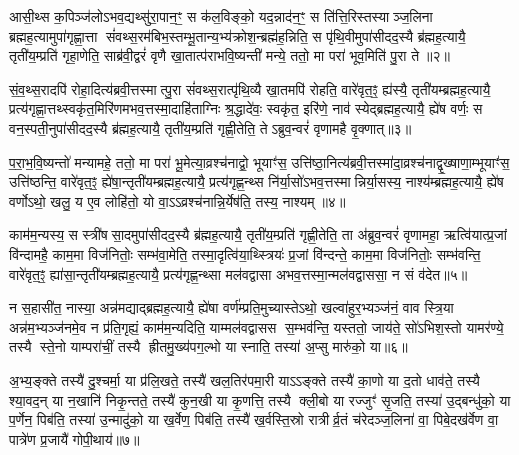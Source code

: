 आसी॒थ्स क॒पिञ्ज॑लोऽभव॒द्यथ्सु॑रा॒पान॒ꣳ॒ स क॑ल॒विङ्को॒ यद॒न्नाद॑न॒ꣳ॒ स ति॑त्ति॒रिस्तस्याञ्ज॒लिना ब्रह्मह॒त्यामुपा॑गृह्णा॒त्ता सं॑वथ्स॒रम॑बिभ॒स्तम्भू॒तान्य॒भ्य॑क्रोश॒न्ब्रह्म॑ह॒न्निति॒ स पृ॑थि॒वीमुपा॑सीदद॒स्यै ब्र॑ह्मह॒त्यायै॒ तृती॑य॒म्प्रति॑ गृहा॒णेति॒ साब्र॑वी॒द्वरं॑ वृणै खा॒तात्प॑राभवि॒ष्यन्ती॑ मन्ये॒ ततो॒ मा परा॑ भूव॒मिति॑ पु॒रा ते॥२॥

सं॒व॒थ्स॒रादपि॑ रोहा॒दित्य॑ब्रवी॒त्तस्मात्पु॒रा सं॑वथ्स॒रात्पृ॑थि॒व्यै खा॒तमपि॑ रोहति॒ वारे॑वृत॒ꣵ॒ ह्य॑स्यै॒ तृती॑यम्ब्रह्मह॒त्यायै॒ प्रत्य॑गृह्णा॒त्तथ्स्वकृ॑त॒मिरि॑णमभव॒त्तस्मा॒दाहि॑ताग्निः श्र॒द्धादे॑वः॒ स्वकृ॑त॒ इरि॑णे॒ नाव॑ स्येद्ब्रह्मह॒त्यायै॒ ह्ये॑ष वर्णः॒ स वन॒स्पती॒नुपा॑सीदद॒स्यै ब्र॑ह्मह॒त्यायै॒ तृती॑य॒म्प्रति॑ गृह्णी॒तेति॒ तेऽब्रुव॒न्वरं॑ वृणामहै वृ॒क्णात्॥३॥

प॒रा॒भ॒वि॒ष्यन्तो॑ मन्यामहे॒ ततो॒ मा परा॑ भू॒मेत्या॒व्रश्च॑नाद्वो॒ भूयाꣳ॑स॒ उत्ति॑ष्ठा॒नित्य॑ब्रवी॒त्तस्मा॑दा॒व्रश्च॑नाद्वृ॒ख्षाणा॒म्भूयाꣳ॑स॒ उत्ति॑ष्ठन्ति॒ वारे॑वृत॒ꣵ॒ ह्ये॑षा॒न्तृती॑यम्ब्रह्मह॒त्यायै॒ प्रत्य॑गृह्ण॒न्थ्स नि॑र्या॒सो॑ऽभव॒त्तस्मान्निर्या॒सस्य॒ नाश्य॑म्ब्रह्मह॒त्यायै॒ ह्ये॑ष वर्णोऽथो॒ खलु॒ य ए॒व लोहि॑तो॒ यो वा॒ऽऽव्रश्च॑नान्नि॒र्येष॑ति॒ तस्य॒ नाश्यम्॥४॥

काम॑म॒न्यस्य॒ स स्त्री॑षसा॒दमुपा॑सीदद॒स्यै ब्र॑ह्मह॒त्यायै॒ तृती॑य॒म्प्रति॑ गृह्णी॒तेति॒ ता अ॑ब्रुव॒न्वरं॑ वृणामहा॒ ऋत्वि॑यात्प्र॒जां वि॑न्दामहै॒ काम॒मा विज॑नितोः॒ सम्भ॑वा॒मेति॒ तस्मा॒दृत्वि॑या॒थ्स्त्रियः॑ प्र॒जां वि॑न्दन्ते॒ काम॒मा विज॑नितोः॒ सम्भ॑वन्ति॒ वारे॑वृत॒ꣵ॒ ह्या॑सा॒न्तृती॑यम्ब्रह्मह॒त्यायै॒ प्रत्य॑गृह्ण॒न्थ्सा मल॑वद्वासा अभव॒त्तस्मा॒न्मल॑वद्वाससा॒ न सं व॑देत॥५॥

न स॒हासी॑त॒ नास्या॒ अन्न॑मद्याद्ब्रह्मह॒त्यायै॒ ह्ये॑षा वर्ण॑म्प्रति॒मुच्यास्तेऽथो॒ खल्वा॑हुर॒भ्यञ्ज॑नं॒ वाव स्त्रि॒या अन्न॑म॒भ्यञ्ज॑नमे॒व न प्र॑ति॒गृह्यं॒ काम॑म॒न्यदिति॒ याम्मल॑वद्वासस स॒म्भव॑न्ति॒ यस्ततो॒ जाय॑ते॒ सो॑ऽभिश॒स्तो यामर॑ण्ये॒ तस्यै स्ते॒नो याम्परा॑चीं॒ तस्यै ह्रीतमु॒ख्य॑पग॒ल्भो या स्नाति॒ तस्या॑ अ॒प्सु मारु॑को॒ या॥६॥

अ॒भ्य॒ङ्क्ते तस्यै॑ दु॒श्चर्मा॒ या प्र॑लि॒खते॒ तस्यै॑ खल॒तिर॑पमा॒री याऽऽङ्क्ते तस्यै॑ का॒णो या द॒तो धाव॑ते॒ तस्यै श्या॒वद॒न् या न॒खानि॑ निकृ॒न्तते॒ तस्यै॑ कुन॒खी या कृ॒णत्ति॒ तस्यै क्ली॒बो या रज्जुꣳ॑ सृ॒जति॒ तस्या॑ उ॒द्बन्धु॑को॒ या प॒र्णेन॒ पिब॑ति॒ तस्या॑ उ॒न्मादु॑को॒ या ख॒र्वेण॒ पिब॑ति॒ तस्यै॑ ख॒र्वस्ति॒स्रो रात्रीर्व्र॒तं च॑रेदञ्ज॒लिना॑ वा॒ पिबे॒दख॑र्वेण वा॒ पात्रे॑ण प्र॒जायै॑ गोपी॒थाय॑॥७॥

{\anuvakamend[{यथ्सो॑म॒पान॑न्ते वृ॒क्णात्तस्य॒ नाश्यं॑ वदेत॒ मारु॑को॒ याऽख॑र्वेण वा॒ त्रीणि॑ च॥१॥}]}

